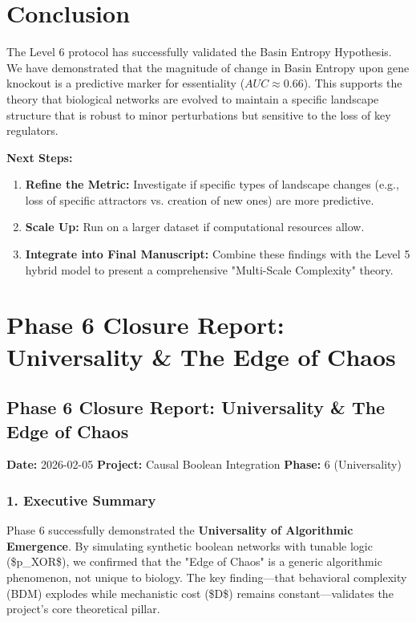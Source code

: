 \documentclass{article}
\begin{document}
\section{Conclusion}
The Level 6 protocol has successfully validated the Basin Entropy Hypothesis. We have demonstrated that the magnitude of change in Basin Entropy upon gene knockout is a predictive marker for essentiality ($AUC \approx 0.66$). This supports the theory that biological networks are evolved to maintain a specific landscape structure that is robust to minor perturbations but sensitive to the loss of key regulators.

\textbf{Next Steps:}
\begin{enumerate}
    \item \textbf{Refine the Metric:} Investigate if specific types of landscape changes (e.g., loss of specific attractors vs. creation of new ones) are more predictive.
    \item \textbf{Scale Up:} Run on a larger dataset if computational resources allow.
    \item \textbf{Integrate into Final Manuscript:} Combine these findings with the Level 5 hybrid model to present a comprehensive "Multi-Scale Complexity" theory.
\end{enumerate}



\section{Phase 6 Closure Report: Universality \& The Edge of Chaos}
\subsection{Phase 6 Closure Report: Universality \& The Edge of Chaos}

\textbf{Date:} 2026-02-05
\textbf{Project:} Causal Boolean Integration
\textbf{Phase:} 6 (Universality)

\subsubsection{1. Executive Summary}
Phase 6 successfully demonstrated the \textbf{Universality of Algorithmic Emergence}. By simulating synthetic boolean networks with tunable logic (\$p\_{XOR}\$), we confirmed that the "Edge of Chaos" is a generic algorithmic phenomenon, not unique to biology. The key finding—that behavioral complexity (BDM) explodes while mechanistic cost (\$D\$) remains constant—validates the project's core theoretical pillar.
\end{document}

